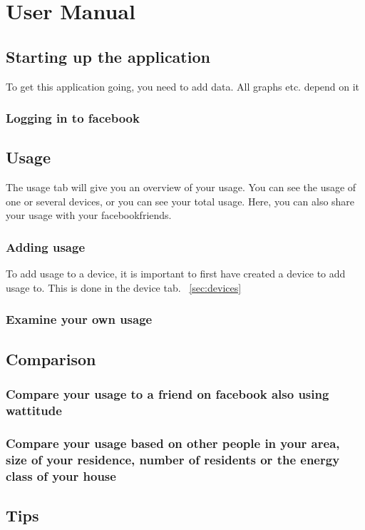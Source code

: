 \chapter{User Manual}

\section{Starting up the application}
To get this application going, you need to add data. All graphs etc. depend on it
\subsection{Logging in to facebook}

\section{Usage}
The usage tab will give you an overview of your usage. You can see the usage of one or several devices, or you can see your total usage. Here, you can also share your usage with your facebookfriends.
\subsection{Adding usage}
To add usage to a device, it is important to first have created a device to add usage to. This is done in the device tab. ~\ref{sec:devices}
\subsection{Examine your own usage}

\section{Comparison}
\subsection{Compare your usage to a friend on facebook also using wattitude}
\subsection{Compare your usage based on other people in your area, size of your residence, number of residents or the energy class of your house}

\section{Tips}
